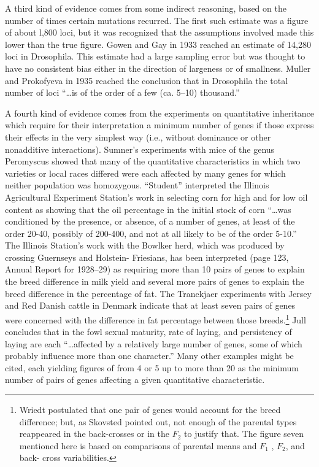 A third kind of evidence comes from some indirect reasoning, based on the number of times certain mutations
recurred. The first such estimate was a figure of about l,800 loci, but it was recognized that the
assumptions involved made this lower than the true figure. Gowen and Gay in 1933 reached an estimate of
14,280 loci in Drosophila. This estimate had a large sampling error but was thought to have no consistent
bias either in the direction of largeness or of smallness. Muller and Prokofyeva in 1935 reached the
conclusion that in Drosophila the total number of loci ``\ldots is of the order of a few (ca. 5--10)
thousand.''

A fourth kind of evidence comes from the experiments on quantitative inheritance which require for their
interpretation a minimum number of genes if those express their effects in the very simplest way (i.e.,
without dominance or other nonadditive interactions). Sumner's experiments with mice of the genus Peromyscus
showed that many of the quantitative characteristics in which two varieties or local races differed were
each affected by many genes for which neither population was homozygous. ``Student'' interpreted the Illinois
Agricultural Experiment Station's work in selecting corn for high and for low oil content as showing that the
oil percentage in the initial stock of corn ``\ldots was conditioned by the presence, or absence, of a number
of genes, at least of the order 20-40, possibly of 200-400, and not at all likely to be of the order 5-10.''
The Illinois Station's work with the Bowlker herd, which was produced by crossing Guernseys and Holstein-
Friesians, has been interpreted (page 123, Annual Report for 1928--29) as requiring more than 10 pairs of
genes to explain the breed difference in milk yield and several more pairs of genes to explain the breed
difference in the percentage of fat. The Tranekjaer experiments with Jersey and Red Danish cattle in Denmark
indicate that at least seven pairs of genes were concerned with the difference in fat percentage between those
breeds.\footnote{Wriedt postulated that one pair of genes would account for the breed difference; but, as
Skovsted pointed out, not enough of the parental types reappeared in the back-crosses or in the $F_2$ to justify
that. The figure seven mentioned here is based on comparisons of parental means and $F_1$ , $F_2$, and back-
cross variabilities.} Jull concludes that in the fowl sexual maturity, rate of laying, and persistency of laying
are each ``\ldots affected by a relatively large number of genes, some of which probably influence more than one
character.'' Many other examples might be cited, each yielding figures of from 4 or 5 up to more than 20 as the
minimum number of pairs of genes affecting a given quantitative characteristic.

